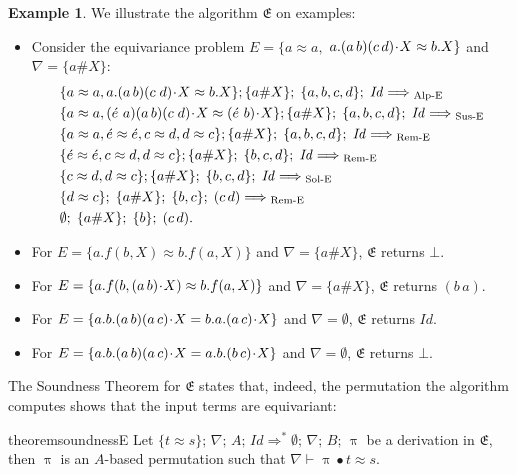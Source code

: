 \documentclass[11pt,a4paper]{amsart}
\theoremstyle{definition}
\newtheorem{example}{Example}
\newcommand{\Lra}{\Longrightarrow}
\newcommand{\swap}[2]{\ensuremath{(#1\, #2)}}
\newcommand{\idp}{\mathit{Id}}
\newcommand{\perm}{\approx}
\newcommand{\permap}{{\mkern 1mu\cdot \mkern 1mu}}
\newcommand{\permef}{\bullet}
\newcommand\ppi{\uppi}
\newcommand{\msys}{\mathfrak{E}}
\newcommand{\fresh}[1]{{\acute{#1}}}
\newcommand{\Atoms}{A}
\newcommand{\nablai}{{\nabla}}
\begin{document}
\begin{example}\label{exmp:equiv}
  We illustrate the algorithm $\msys$ on examples:
\begin{itemize}
\item
  Consider the equivariance problem $E= \{a \perm a, $ $a.\swap{a}{b}(c\,d)\permap X\perm 
\allowbreak b.X\}$ and $\nablai=\{a\#X\}$:
 \begin{alignat*}{3}
   &  \{a \perm a, a.\swap{a}{b}(c\;d)\permap X\perm\allowbreak b.X\} ; \{a\#X\} ;\; \{a,b,c,d\} ;\;\idp  \Lra_{\text{ Alp-E}}{} \\
  &  \{a \perm a, \swap{\fresh{e}\,}{a}\swap{a}{b}(c\;d)\permap X\perm\allowbreak \swap{\fresh{e}\,}{b}\permap X\} ;\{a\#X\} ;\; \{a,b,c,d\} ;\; \idp \Lra_{\text{ Sus-E}} \\
  & \{a \perm a,\fresh{e}\perm\fresh{e},c\perm d, d\perm c \} ;\{a\#X\} ;\; \{a,b,c,d\} ;\; \idp \Lra_{\text{ Rem-E}}{}\\
  & \{\fresh{e}\perm\fresh{e},c\perm d, d\perm c \}; \{a\#X\} ;\; \{b,c,d\} ;\;\idp \Lra_{\text{ Rem-E}}{}\\
  & \{c\perm d, d\perm c \};\{a\#X\} ;\; \{b,c,d\} ;\;\idp \Lra_{\text{ Sol-E}}\\
  & \{d\perm c \} ;\; \{a\#X\} ;\; \{b,c\} ;\; \swap{c}{d} \Lra_{\text{ Rem-E}}\\
  &  \emptyset ;\; \{a\#X\} ;\; \{b\} ;\;\swap{c}{d}.
\end{alignat*}
  \item For $E=\{a.f(b,X) \perm b.f(a,X)\}$ and $\nablai=\{a\#X\}$, $\msys$ returns $\bot$.
  \item For $E=\{a.f(b,\swap{a}{b}\permap X) \perm b.f(a,X)\} $ and $\nablai=\{a\#X\}$, $\msys$ returns $(b\,a)$.
  \item For $E=\{a.b.\swap{a}{b}\swap{a}{c}\permap X =  b.a. \swap{a}{c}\permap X\}$ and $\nabla=\emptyset$, $\msys$ returns $\idp$.
  \item For $E=\{a.b.\swap{a}{b}\swap{a}{c}\permap X =  a.b. (b\, c)\permap X\}$ and $\nabla=\emptyset$, $\msys$ returns $\bot$.
  \end{itemize}
\end{example}


The Soundness Theorem for $\msys$ states that, indeed, the permutation
the algorithm computes shows that the input terms are equivariant:

\begin{restatable}[Soundness of $\msys$]{theorem}{soundnessE} \label{thm:soundness:equiv}
Let $ \{t\perm s\} ;\,\allowbreak \nablai ;\,\allowbreak \Atoms
;\,\allowbreak \idp \Lra^* \emptyset ;\, \nablai;\, B ;\, \ppi$ be a
derivation in $\msys$, then $\ppi$ is an $\Atoms$-based permutation
such that $\nablai\vdash \ppi\permef t\approx s$.
\end{restatable}
\end{document}
